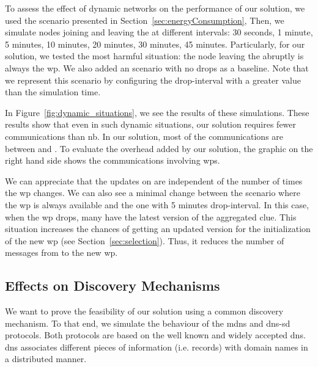 

To assess the effect of dynamic networks on the performance of our solution, we used the scenario presented in Section~\ref{sec:energyConsumption},
Then, we simulate nodes joining and leaving the \Space{} at different intervals: 30 seconds, 1 minute, 5 minutes, 10 minutes, 20 minutes, 30 minutes, 45 minutes.
Particularly, for our solution, we tested the most harmful situation: the node leaving the \Space{} abruptly is always the \ac{wp}.
We also added an scenario with no drops as a baseline.
Note that we represent this scenario by configuring the drop-interval with a greater value than the simulation time.

In Figure~\ref{fig:dynamic_situations}, we see the results of these simulations.
These results show that even in such dynamic situations, our solution requires fewer communications than \acl{nb}.
In our solution, most of the communications are between \consumers{} and \providers{}.
To evaluate the overhead added by our solution, the graphic on the right hand side shows the communications involving \acp{wp}.

We can appreciate that the updates on \consumers{} are independent of the number of times the \ac{wp} changes.
We can also see a minimal change between the scenario where the \ac{wp} is always available and the one with 5 minutes drop-interval.
In this case, when the \ac{wp} drops, many \consumers{} have the latest version of the aggregated clue.
This situation increases the chances of getting an updated version for the initialization of the new \ac{wp} (see Section~\ref{sec:selection}).
Thus, it reduces the number of messages from \providers{} to the new \ac{wp}.


\subsection{Effects on Discovery Mechanisms}
\label{sec:mdns}

We want to prove the feasibility of our solution using a common discovery mechanism.
To that end, we simulate the behaviour of the \ac{mdns} and \ac{dns-sd}  protocols.
Both protocols are based on the well known and widely accepted \ac{dns}.
\ac{dns} associates different pieces of information (i.e. records) with domain names in a distributed manner.

